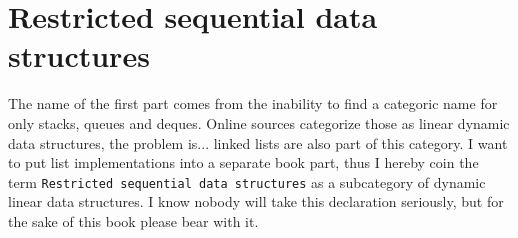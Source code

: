 \part{Restricted sequential data structures} \label{pt:one}

The name of the first part comes from the inability to find a categoric name for only stacks, queues and deques. Online sources categorize those as linear dynamic data structures, the problem is... linked lists are also part of this category. I want to put list implementations into a separate book part, thus I hereby coin the term \texttt{Restricted sequential data structures} as a subcategory of dynamic linear data structures. I know nobody will take this declaration seriously, but for the sake of this book please bear with it.    
